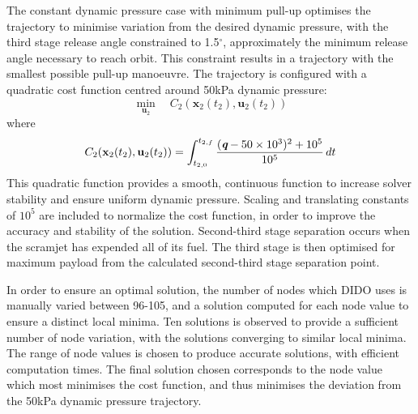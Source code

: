 The constant dynamic pressure case with minimum pull-up optimises the trajectory to minimise variation from the desired dynamic pressure, with the third stage release angle constrained to 1.5$^\circ$, approximately the minimum release angle necessary to reach orbit. This constraint results in a trajectory with the smallest possible pull-up manoeuvre. 
The trajectory is configured with a quadratic cost function centred around 50kPa dynamic pressure:
\begin{equation} 
\min\limits_{\textbf{u}_2} \quad C_2(\textbf{x}_{2}(t_2),\textbf{u}_{2}(t_2))
\end{equation}
where
\begin{equation}
C_2(\textbf{x}_{2}(t_2),\textbf{u}_{2}(t_2)) = \int_{t_{2,0}}^{t_{2,f}} \frac{(\textit{\textbf{q}}-50\times 10^3)^2+10^5}{10^5} \, dt
\end{equation}
This quadratic function provides a smooth, continuous function to increase solver stability and ensure uniform dynamic pressure. Scaling and translating constants of $10^5$ are included to normalize the cost function, in order to improve the accuracy and stability of the solution. Second-third stage separation occurs when the scramjet has expended all of its fuel.  The third stage is then optimised for maximum payload from the calculated second-third stage separation point. 

In order to ensure an optimal solution, the number of nodes which DIDO uses is manually varied between 96-105, and a solution computed for each node value to ensure a distinct local minima. Ten solutions is observed to provide a sufficient number of node variation, with the solutions converging to similar local minima. The range of node values is chosen to produce accurate solutions, with efficient computation times. The final solution chosen corresponds to the node value which most minimises the cost function, and thus minimises the deviation from the 50kPa dynamic pressure trajectory. 

